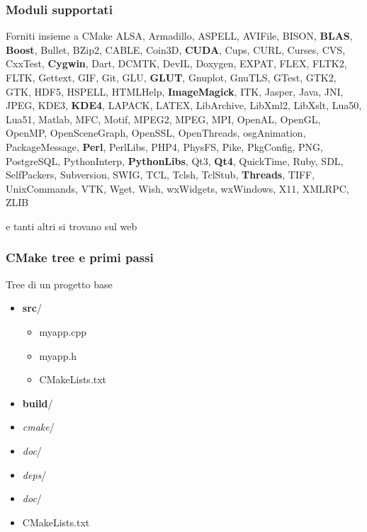 \documentclass[10pt] {beamer}
\begin{document}

\begin{frame}[fragile]
 \frametitle{Moduli supportati}
\begin{block}{Forniti insieme a CMake}
 ALSA, Armadillo, ASPELL, AVIFile, BISON, \textbf{BLAS}, \textbf{Boost}, Bullet, BZip2, CABLE, 
 Coin3D, \textbf{CUDA}, Cups, CURL, Curses, CVS, CxxTest, \textbf{Cygwin}, Dart, DCMTK, 
 DevIL, Doxygen, EXPAT, FLEX, FLTK2, FLTK, Gettext,
 GIF, Git, GLU, \textbf{GLUT}, Gnuplot, GnuTLS, GTest, GTK2, GTK, HDF5, HSPELL, 
 HTMLHelp, \textbf{ImageMagick}, ITK, Jasper, Java, JNI, JPEG, KDE3, \textbf{KDE4}, LAPACK, LATEX, 
 LibArchive, LibXml2, LibXslt, Lua50, Lua51, Matlab, MFC, Motif, MPEG2, MPEG, MPI, 
 OpenAL, OpenGL, OpenMP, OpenSceneGraph, OpenSSL, OpenThreads, osgAnimation,  
PackageMessage, \textbf{Perl}, PerlLibs, PHP4, PhysFS, Pike, PkgConfig, PNG, PostgreSQL,  PythonInterp, 
 \textbf{PythonLibs}, Qt3, \textbf{Qt4}, QuickTime, Ruby, SDL, SelfPackers, Subversion, 
 SWIG, TCL, Tclsh, TclStub, \textbf{Threads}, TIFF, UnixCommands, VTK, Wget, 
 Wish, wxWidgets, wxWindows, X11, XMLRPC, ZLIB
\end{block}
e tanti altri si trovano sul web
\end{frame}

\begin{frame}[fragile]
\frametitle{CMake tree e primi passi}

\begin{block}{Tree di un progetto base}
\begin{itemize}
\item \textbf{src}/
\begin{itemize}
	\item myapp.cpp
	\item myapp.h
	\item CMakeLists.txt
\end{itemize}
\item \textbf{build}/
\item \emph{cmake}/
\item \emph{doc}/
\item \emph{deps}/
\item \emph{doc}/
\item CMakeLists.txt
\end{itemize}
\end{block}
\end{frame}
\end{document}
